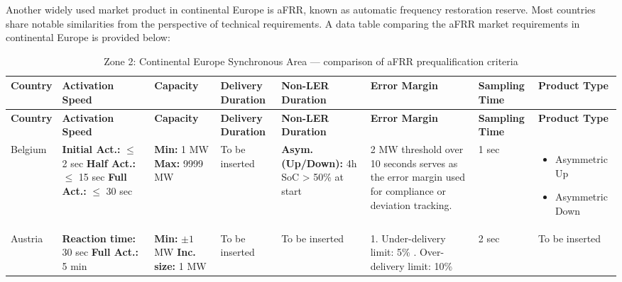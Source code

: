 \clearpage
\begin{landscape}

    Another widely used market product in continental Europe is aFRR, known as automatic frequency restoration reserve. Most countries share notable similarities from the perspective of technical requirements. A data table comparing the aFRR market requirements in continental Europe is provided below:


\tiny
\setlength{\tabcolsep}{4pt}
\renewcommand{\arraystretch}{1.3}
\setlength{\LTleft}{0pt}
\setlength{\LTright}{0pt}
\begin{longtable}{|p{2.5cm}|p{2.5cm}|p{2.5cm}|p{2.5cm}|p{2.5cm}|p{4cm}|p{2.5cm}|p{2.5cm}|}
\caption{Zone 2: Continental Europe Synchronous Area --- comparison of aFRR prequalification criteria}\label{tab:continental_europe_afrr}\\
\hline
\textbf{Country} & \textbf{Activation Speed} & \textbf{Capacity} & \textbf{Delivery Duration} & \textbf{Non-LER Duration} & \textbf{Error Margin} & \textbf{Sampling Time} & \textbf{Product Type} \\
\hline
\endfirsthead

\hline
\textbf{Country} & \textbf{Activation Speed} & \textbf{Capacity} & \textbf{Delivery Duration} & \textbf{Non-LER Duration} & \textbf{Error Margin} & \textbf{Sampling Time} & \textbf{Product Type} \\
\hline
\endhead

Belgium & 
\textbf{Initial Act.:} $\leq$ 2 sec \newline
\textbf{Half Act.:} $\leq$ 15 sec \newline
\textbf{Full Act.:} $\leq$ 30 sec \newline
& 
\textbf{Min: }1 MW 
\newline \textbf{Max: }9999 MW
& To be inserted & 
\textbf{Asym. (Up/Down): }4h 
\newline SoC > 50\% at start
& 
2 MW threshold over 10 seconds serves as the error margin used for compliance or deviation tracking.
& 1 sec & 
\begin{itemize}[leftmargin=*, nosep]
  \item Asymmetric Up
  \item Asymmetric Down
\end{itemize}\\
\hline

Austria & 
\textbf{Reaction time:} 30 sec \newline
\textbf{Full Act.:} 5 min \newline
& 
\textbf{Min: }$\pm 1$ MW
\newline \textbf{Inc. size: }1 MW 
& 
To be inserted
& 
To be inserted 
& 
1. Under-delivery limit: 5\%
\newline 2. Over-delivery limit: 10\%
& 2 sec & To be inserted \\


\end{longtable}
\end{landscape}
